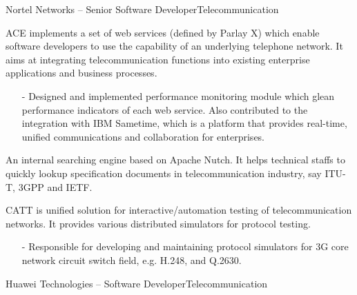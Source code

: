 \documentclass[10pt,a4paper]{moderncv}
\begin{document}
{Nortel Networks -- Senior Software Developer}{Telecommunication}{}{}{}
{
  ACE implements a set of web services (defined by Parlay X) which enable software developers to use the capability of an underlying telephone network. It aims at integrating telecommunication functions into existing enterprise applications and business processes.
  \begin{itemize}
    \item[-] Designed and implemented performance monitoring module which glean performance indicators of each web service. Also contributed to the integration with IBM Sametime, which is a platform that provides real-time, unified communications and collaboration for enterprises.
  \end{itemize}
}

\vspace*{0.2\baselineskip}
{
    An internal searching engine based on Apache Nutch. It helps technical staffs to quickly lookup specification documents in telecommunication industry, say ITU-T, 3GPP and IETF.
}

\vspace*{0.2\baselineskip}
{
  CATT is unified solution for interactive/automation testing of telecommunication networks. It provides various distributed simulators for protocol testing.
  \begin{itemize}
    \item[-] Responsible for developing and maintaining protocol simulators for 3G core network circuit switch field, e.g. H.248, and Q.2630.
  \end{itemize}
}
\vspace*{0.2\baselineskip}
\vspace*{0.2\baselineskip}
{Huawei Technologies -- Software Developer}{Telecommunication}{}{}{}
\end{document}
